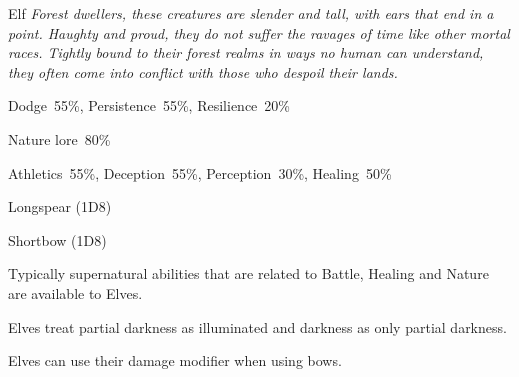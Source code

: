 \newpage

\begin{monsterbox}{Elf}
	\textit{Forest dwellers, these creatures are slender and tall, with ears that end in a point. Haughty and proud, they do not suffer the ravages of time like other mortal races. Tightly bound to their forest realms in ways no human can understand, they often come into conflict with those who despoil their lands.}\\
	\rpghline
	\basics[%
        hitpoints  = 11, 
	majorwound = 6,
	damagemodifier = 0,
	powerpoints = 13,
	movementrate = 15m,
	armor = Leather (2AP),
	plunderrating = 1
	]
	\rpghline%
	\stats[ %
		STR = 2D6+3 (10),
		CON = 3D6   (11),
		DEX = 3D6+6 (17),
		SIZ = 2D6+3 (10),
		INT = 3D6+6 (17),
		POW = 2D6+6 (13),
		CHA = 3D6   (11)
	]
	\rpghline%
	\begin{rpg-monsteraction}[Resistances]
		Dodge~55\%, Persistence~55\%, Resilience~20\%
	\end{rpg-monsteraction}
	\begin{rpg-monsteraction}[Knowledge]
    		Nature lore~80\%
	\end{rpg-monsteraction}
	\begin{rpg-monsteraction}[Practical]
		Athletics~55\%, Deception~55\%, Perception~30\%, Healing~50\%
	\end{rpg-monsteraction}
	\begin{rpg-monsteraction}
		Longspear (1D8)
	\end{rpg-monsteraction}
	\begin{rpg-monsteraction}
		Shortbow (1D8)
	\end{rpg-monsteraction}
	\begin{rpg-monsteraction}[Supernatural]
		Typically supernatural abilities that are related to Battle, Healing and Nature are available to Elves.
	\end{rpg-monsteraction}
	\begin{rpg-monsteraction}
		Elves treat partial darkness as illuminated and darkness as only partial darkness.
	\end{rpg-monsteraction}
	\begin{rpg-monsteraction}
		Elves can use their damage modifier when using bows.
	\end{rpg-monsteraction}

\end{monsterbox}

